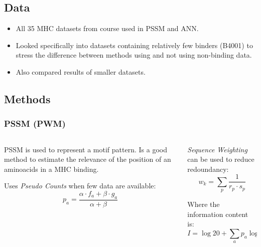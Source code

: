 \documentclass[presentation]{beamer}   %
\begin{document}
\subsection{Data}
\begin{frame}
  \begin{itemize}
    \item<1> All 35 MHC datasets from course used in PSSM and ANN.
    \item<2>  Looked specifically into datasets containing relatively few binders (B4001) to stress the difference between methods using and not using non-binding data.
    \item<3> Also compared results of smaller datasets.
  \end{itemize}
\end{frame}

\subsection{Methods}
\begin{frame}
 \frametitle{PSSM (PWM)}
 \begin{columns}
  \begin{column}{5cm}
   \begin{block}\centering
    PSSM is used to represent a motif pattern.
    Is a good method to estimate the relevance 
    of the position of an aminoacids in a MHC binding. 
   \end{block}
   \pause
   \begin{block}\centering
   Uses \textit{Pseudo Counts} when few data are available:
    \begin{equation}
     p_a = \frac{\alpha \cdot f_a + \beta \cdot g_a}{\alpha + \beta}
    \end{equation}
   \end{block}
   \pause
  \end{column}
  \begin{column}{5cm}
   \begin{block}\centering
    \textit{Sequence Weighting} can be used to reduce redoundancy:
    \begin{equation}
     w_{k} = \sum_{p}{\frac{1}{r_p \cdot s_p}}
    \end{equation}

   \end{block}
   \pause
   \begin{block}\centering
    Where the information content is:
     \begin{equation}
     I = \log{ 20 } + \sum_{a}{ p_{a}\log{p_{a}} }
    \end{equation}
   \end{block}
  
  
  \end{column}
 \end{columns}

\end{frame}
\end{document}
